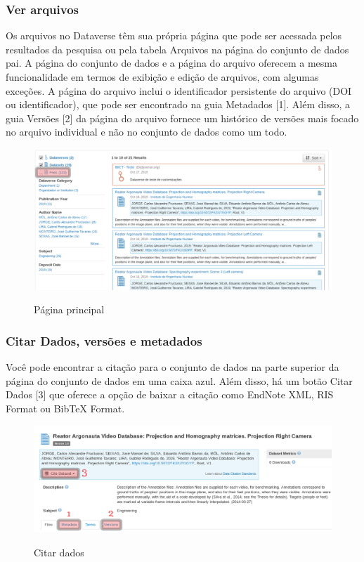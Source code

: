 \documentclass[12pt,hidelinks]{article}
\begin{document}
	    \subsubsection{Ver arquivos}
	    
\qquad Os arquivos no Dataverse têm sua própria página que pode ser acessada pelos resultados da pesquisa ou pela tabela Arquivos na página do conjunto de dados pai. A página do conjunto de dados e a página do arquivo oferecem a mesma funcionalidade em termos de exibição e edição de arquivos, com algumas exceções. A página do arquivo inclui o identificador persistente do arquivo (DOI ou identificador), que pode ser encontrado na guia Metadados [1]. Além disso, a guia Versões [2] da página do arquivo fornece um histórico de versões mais focado no arquivo individual e não no conjunto de dados como um todo.
	    
\begin{figure}[H]
\caption{Página principal}
\centering
    \includegraphics[width=1.0\textwidth]{USAAAA.png}
    \label{print1}
\end{figure}
   
	    \subsubsection{Citar Dados, versões e metadados}
	   
\qquad Você pode encontrar a citação para o conjunto de dados na parte superior da página do conjunto de dados em uma caixa azul. Além disso, há um botão Citar Dados [3] que oferece a opção de baixar a citação como EndNote XML, RIS Format ou BibTeX Format.
	    
\begin{figure}[H]
\caption{Citar dados}
\centering
    \includegraphics[width=1.0\textwidth]{PFVFU.png}
    \label{print2}
\end{figure}
\end{document}

